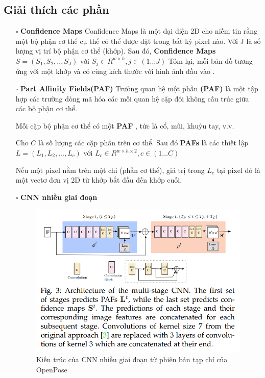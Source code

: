 \subsection{Giải thích các phần}
\begin{itemize}
  \item[$\square$] \textbf{Confidence Maps}
  Confidence Maps là một đại diện 2D cho niềm tin rằng một bộ phận cơ thể cụ thể có thể được đặt trong bất kỳ pixel nào. Với J là số lượng vị trí bộ phận cơ thể (khớp). Sau đó, \textbf{Confidence Maps} $S = (S_1, S_2, .., S_J)$ với $S_j \in R^{w \times h},j \in (1 \ldots J)$
  Tóm lại, mỗi bản đồ tương ứng với một khớp và có cùng kích thước với hình ảnh đầu vào .

  \item[$\square$] \textbf{Part Affinity Fields(PAF)}
  Trường quan hệ một phần \textbf{(PAF)} là một tập hợp các trường dòng mã hóa các mối quan hệ cặp đôi không cấu trúc giữa các bộ phận cơ thể.

Mỗi cặp bộ phận cơ thể có một \textbf{PAF} , tức là cổ, mũi, khuỷu tay, v.v.

Cho $C$ là số lượng các cặp phần trên cơ thể. Sau đó \textbf{PAFs} là các thiết lập \textbf{$L = (L_1, L_2, ..., L_c)$} với \textbf{$L_c \in R^{w \times h \times 2},c \in (1 \ldots C)$}

Nếu một pixel nằm trên một chi (phần cơ thể), giá trị trong $L_c$ tại pixel đó là một vectơ đơn vị 2D từ khớp bắt đầu đến khớp cuối.
\item[$\square$] \textbf{CNN nhiều giai đoạn}

\FloatBarrier
\begin{figure}[htp]
\begin{center}
\includegraphics[scale=0.65]{chap3/c3_figs/CNN_m.png}
\end{center}
\caption{Kiến trúc của CNN nhiều giai đoạn từ phiên bản tạp chí của OpenPose}
\label{fig:pipelineS}
\end{figure}
\FloatBarrier


\end{itemize}
